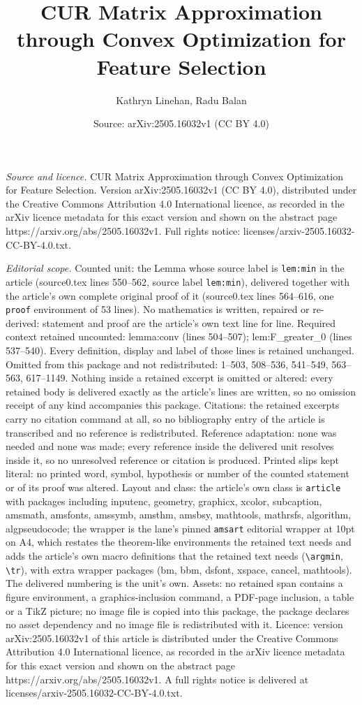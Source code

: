 \documentclass[10pt,a4paper]{amsart}
\title[CUR Matrix Approximation through Convex Optimization for Fea]{CUR Matrix Approximation through Convex Optimization for Feature Selection}
\author{Kathryn Linehan, Radu Balan}
\date{Source: arXiv:2505.16032v1 (CC BY 4.0)}
\begin{document}
\maketitle

\noindent\emph{Source and licence.} CUR Matrix Approximation through Convex Optimization for Feature Selection. Version arXiv:2505.16032v1 (CC BY 4.0), distributed under the Creative Commons Attribution 4.0 International licence, as recorded in the arXiv licence metadata for this exact version and shown on the abstract page https://arxiv.org/abs/2505.16032v1. Full rights notice: licenses/arxiv-2505.16032-CC-BY-4.0.txt.\par\smallskip

\noindent\textit{Editorial scope.} Counted unit: the Lemma whose source label is \texttt{lem:min} in the article (source0.tex lines 550--562, source label \texttt{lem:min}), delivered together with the article's own complete original proof of it (source0.tex lines 564--616, one \texttt{proof} environment of 53 lines). No mathematics is written, repaired or re-derived: statement and proof are the article's own text line for line. Required context retained uncounted: lemma:conv (lines 504--507); lem:F\_greater\_0 (lines 537--540). Every definition, display and label of those lines is retained unchanged. Omitted from this package and not redistributed: 1--503, 508--536, 541--549, 563--563, 617--1149. Nothing inside a retained excerpt is omitted or altered: every retained body is delivered exactly as the article's lines are written, so no omission receipt of any kind accompanies this package. Citations: the retained excerpts carry no citation command at all, so no bibliography entry of the article is transcribed and no reference is redistributed. Reference adaptation: none was needed and none was made; every reference inside the delivered unit resolves inside it, so no unresolved reference or citation is produced. Printed slips kept literal: no printed word, symbol, hypothesis or number of the counted statement or of its proof was altered. Layout and class: the article's own class is \texttt{article} with packages including inputenc, geometry, graphicx, xcolor, subcaption, amsmath, amsfonts, amssymb, amsthm, amsbsy, mathtools, mathrsfs, algorithm, algpseudocode; the wrapper is the lane's pinned \texttt{amsart} editorial wrapper at 10pt on A4, which restates the theorem-like environments the retained text needs and adds the article's own macro definitions that the retained text needs (\texttt{\textbackslash argmin}, \texttt{\textbackslash tr}), with extra wrapper packages (bm, bbm, dsfont, xspace, cancel, mathtools). The delivered numbering is the unit's own. Assets: no retained span contains a figure environment, a graphics-inclusion command, a PDF-page inclusion, a table or a TikZ picture; no image file is copied into this package, the package declares no asset dependency and no image file is redistributed with it. Licence: version arXiv:2505.16032v1 of this article is distributed under the Creative Commons Attribution 4.0 International licence, as recorded in the arXiv licence metadata for this exact version and shown on the abstract page https://arxiv.org/abs/2505.16032v1. A full rights notice is delivered at licenses/arxiv-2505.16032-CC-BY-4.0.txt. 
\end{document}
